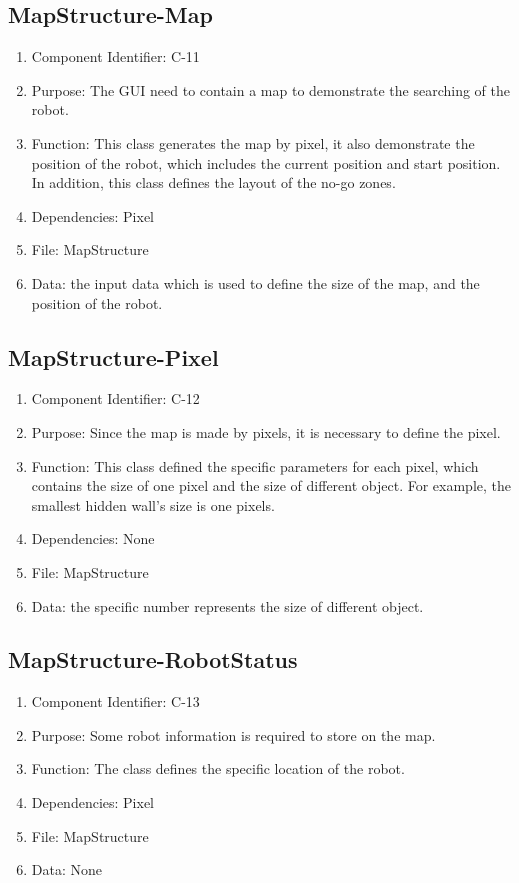 \documentclass[11pt, a4paper]{report}
\begin{document}
\subsection{MapStructure-Map}
\begin{enumerate}
\item Component Identifier: C-11
\item Purpose: The GUI need to contain a map to demonstrate the searching of the robot. 
\item Function: This class generates the map by pixel, it also demonstrate the position of the robot, which includes the current position and start position. In addition, this class defines the layout of the no-go zones.
\item Dependencies: Pixel
\item File: MapStructure
\item Data: the input data which is used to define the size of the map, and the position of the robot.
\end{enumerate}

\subsection{MapStructure-Pixel}
\begin{enumerate}
\item Component Identifier: C-12
\item Purpose: Since the map is made by pixels, it is necessary to define the pixel.
\item Function: This class defined the specific parameters for each pixel, which contains the size of one pixel and the size of different object. For example, the smallest hidden wall's size is one pixels.
\item Dependencies: None
\item File: MapStructure
\item Data: the specific number represents the size of different object.
\end{enumerate}

\subsection{MapStructure-RobotStatus}
\begin{enumerate}
\item Component Identifier: C-13
\item Purpose: Some robot information is required to store on the map.
\item Function: The class defines the specific location of the robot.
\item Dependencies: Pixel
\item File: MapStructure
\item Data: None
\end{enumerate}
\end{document}
